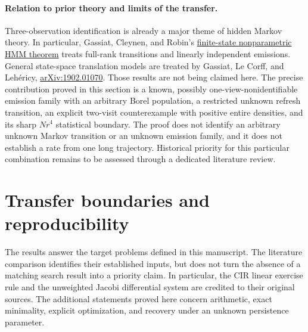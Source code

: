 \documentclass[11pt,a4paper]{article}
\theoremstyle{definition}
\theoremstyle{remark}
\numberwithin{equation}{section}
\begin{document}
\paragraph{Relation to prior theory and limits of the transfer.}
Three-observation identification is already a major theme of hidden Markov
theory.  In particular, Gassiat, Cleynen, and Robin's
\href{https://arxiv.org/abs/1306.4657}{finite-state nonparametric HMM theorem}
treats full-rank transitions and linearly independent emissions.  General
state-space translation models are treated by Gassiat, Le Corff, and
Leh\'ericy, \href{https://arxiv.org/abs/1902.01070}{arXiv:1902.01070}.
Those results are not being claimed here.  The precise contribution proved
in this section is a known, possibly one-view-nonidentifiable emission
family with an arbitrary Borel population, a restricted unknown refresh
transition, an explicit two-visit counterexample with positive entire
densities, and its sharp $Nr^4$ statistical boundary.  The proof does not
identify an arbitrary unknown Markov transition or an unknown emission
family, and it does not establish a rate from one long trajectory.
Historical priority for this particular combination remains to be assessed
through a dedicated literature review.



\section{Transfer boundaries and reproducibility}
\label{p1:sec:scope-checks}
The results answer the target problems defined in this manuscript. The
literature comparison identifies their established inputs, but does not
turn the absence of a matching search result into a priority claim. In
particular, the CIR linear exercise rule and the unweighted Jacobi
differential system are credited to their original sources. The additional
statements proved here concern arithmetic, exact minimality, explicit
optimization, and recovery under an unknown persistence parameter.
\end{document}

